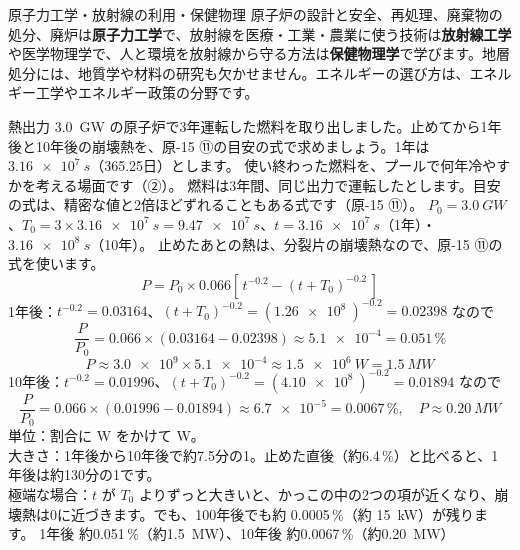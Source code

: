 \begin{phsaki}{原子力工学・放射線の利用・保健物理}
原子炉の設計と安全、再処理、廃棄物の処分、廃炉は\textbf{原子力工学}で、放射線を医療・工業・農業に使う技術は\textbf{放射線工学}や医学物理学で、人と環境を放射線から守る方法は\textbf{保健物理学}で学びます。地層処分には、地質学や材料の研究も欠かせません。エネルギーの選び方は、エネルギー工学やエネルギー政策の分野です。
\end{phsaki}


\begin{phreidai}[使い終わった燃料の崩壊熱]\label{ph:原-16:ex1}
熱出力 \qty{3.0}{GW} の原子炉で3年運転した燃料を取り出しました。止めてから1年後と10年後の崩壊熱を、原-15 ⑪の目安の式で求めましょう。1年は $\qty{3.16e7}{s}$（365.25日）とします。
\phbamen
使い終わった燃料を、プールで何年冷やすかを考える場面です（②）。
\phmushi
燃料は3年間、同じ出力で運転したとします。目安の式は、精密な値と2倍ほどずれることもある式です（原-15 ⑪）。
\phzu
$P_0=\qty{3.0}{GW}$、$T_0=3\times\qty{3.16e7}{s}=\qty{9.47e7}{s}$、$t=\qty{3.16e7}{s}$（1年）・$\qty{3.16e8}{s}$（10年）。
\phriyu
止めたあとの熱は、分裂片の崩壊熱なので、原-15 ⑪の式を使います。
\phtateru
\[ P=P_0\times0.066\left[\,t^{-0.2}-(t+T_0)^{-0.2}\,\right] \]
\phtoku
1年後：$t^{-0.2}=0.03164$、$(t+T_0)^{-0.2}=(\qty{1.26e8}{})^{-0.2}=0.02398$ なので
\[ \frac{P}{P_0}=0.066\times(0.03164-0.02398)\approx\num{5.1e-4}=0.051\,\% \]
\[ P\approx\num{3.0e9}\times\num{5.1e-4}\approx\qty{1.5e6}{W}=\qty{1.5}{MW} \]
10年後：$t^{-0.2}=0.01996$、$(t+T_0)^{-0.2}=(\qty{4.10e8}{})^{-0.2}=0.01894$ なので
\[ \frac{P}{P_0}=0.066\times(0.01996-0.01894)\approx\num{6.7e-5}=0.0067\,\%,\quad P\approx\qty{0.20}{MW} \]
\phtashikame
単位：割合に W をかけて W。\\
大きさ：1年後から10年後で約7.5分の1。止めた直後（約6.4\,\%）と比べると、1年後は約130分の1です。\\
極端な場合：$t$ が $T_0$ よりずっと大きいと、かっこの中の2つの項が近くなり、崩壊熱は0に近づきます。でも、100年後でも約 0.0005\,\%（約 \qty{15}{kW}）が残ります。
\kotae 1年後 約0.051\,\%（約\qty{1.5}{MW}）、10年後 約0.0067\,\%（約\qty{0.20}{MW}）
\end{phreidai}

